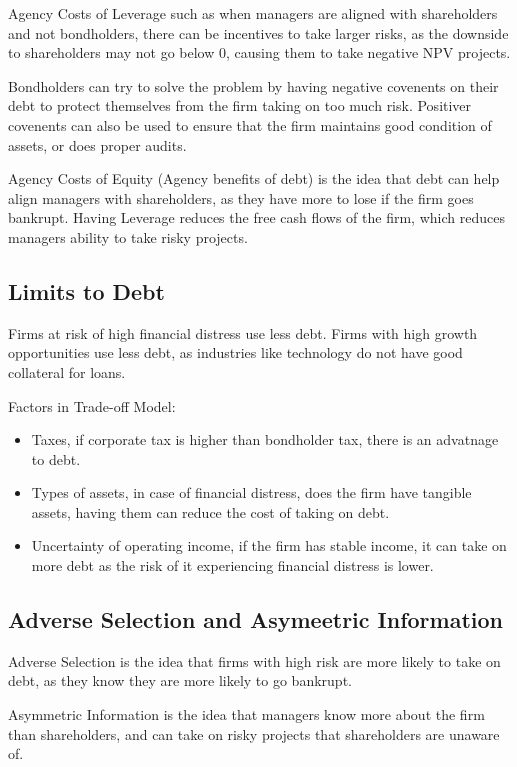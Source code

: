 Agency Costs of Leverage such as when managers are aligned with shareholders and not bondholders,
there can be incentives to take larger risks, as the downside to shareholders may not go below 0, causing them to 
take negative NPV projects.

Bondholders can try to solve the problem by having negative covenents on their debt to protect 
themselves from the firm taking on too much risk. Positiver covenents can also be used to ensure that the firm
maintains good condition of assets, or does proper audits.

Agency Costs of Equity (Agency benefits of debt) is the idea that debt can help align managers with shareholders, as they have more to lose if the firm goes bankrupt.
Having Leverage reduces the free cash flows of the firm, which reduces managers ability to take
risky projects.

\subsection{Limits to Debt}
Firms at risk of high financial distress use less debt.
Firms with high growth opportunities use less debt, as industries like technology
do not have good collateral for loans.

Factors in Trade-off Model:
\begin{itemize}
    \item Taxes, if corporate tax is higher than bondholder tax, there is an advatnage to debt.
    \item Types of assets, in case of financial distress, does the firm have tangible assets, having them can reduce the cost of taking on debt.
    \item Uncertainty of operating income, if the firm has stable income, it can take on more debt as the risk of it experiencing financial distress is lower.
\end{itemize}

\subsection{Adverse Selection and Asymeetric Information}
Adverse Selection is the idea that firms with high risk are more 
likely to take on debt, as they know they are more likely to go bankrupt.

Asymmetric Information is the idea that managers know more about the 
firm than shareholders, and can take on risky projects that shareholders are unaware of.

